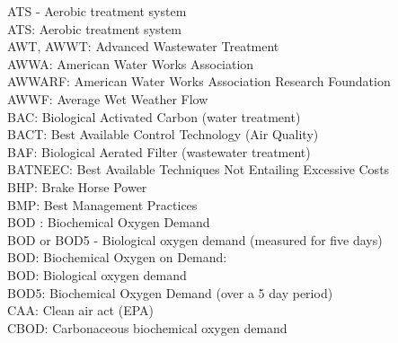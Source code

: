 ATS - Aerobic treatment system
\vspace{0.3cm}\\
ATS:  Aerobic treatment system
\vspace{0.3cm}\\
AWT, AWWT:  Advanced Wastewater Treatment
\vspace{0.3cm}\\
AWWA:  American Water Works Association
\vspace{0.3cm}\\
AWWARF:  American Water Works Association Research Foundation
\vspace{0.3cm}\\
AWWF:  Average Wet Weather Flow
\vspace{0.3cm}\\
BAC:  Biological Activated Carbon (water treatment)
\vspace{0.3cm}\\
BACT:  Best Available Control Technology (Air Quality)
\vspace{0.3cm}\\
BAF:  Biological Aerated Filter (wastewater treatment)
\vspace{0.3cm}\\
BATNEEC:  Best Available Techniques Not Entailing Excessive Costs
\vspace{0.3cm}\\
BHP:  Brake Horse Power
\vspace{0.3cm}\\
BMP:  Best Management Practices
\vspace{0.3cm}\\
BOD :  Biochemical Oxygen Demand
\vspace{0.3cm}\\
BOD or BOD5 - Biological oxygen demand (measured for five days)
\vspace{0.3cm}\\
BOD:  Biochemical Oxygen on Demand:  
\vspace{0.3cm}\\
BOD:  Biological oxygen demand
\vspace{0.3cm}\\
BOD5:  Biochemical Oxygen Demand (over a 5 day period)
\vspace{0.3cm}\\
CAA:  Clean air act (EPA)
\vspace{0.3cm}\\
CBOD:  Carbonaceous biochemical oxygen demand 
\vspace{0.3cm}\\
